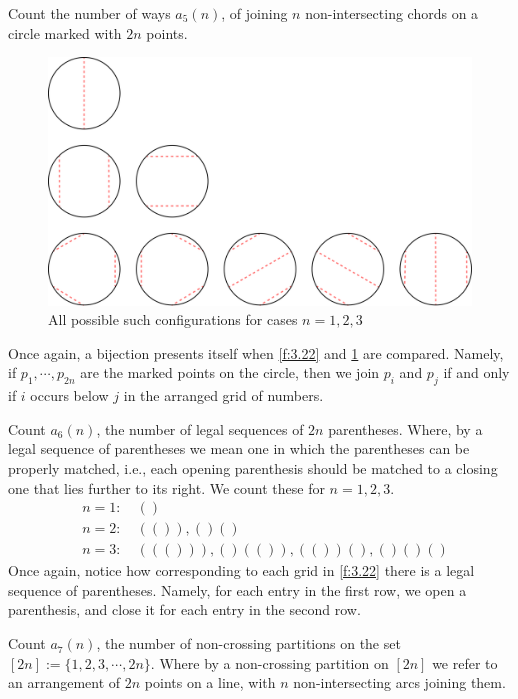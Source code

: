 \begin{question}
Count the number of ways $a_5(n)$, of joining $n$ non-intersecting chords on a circle marked with $2n$ points.     
\end{question}
\begin{solution}
\begin{figure}[H]
    \centering
    \includegraphics[width=0.8\linewidth]{Images/Figure14.png}
    \caption{All possible such configurations for cases $n=1,2,3$}
    \label{f:3.24}
\end{figure}
Once again, a bijection presents itself when \cref{f:3.22} and \cref{f:3.24} are compared. Namely, if $p_1,\cdots,p_{2n}$ are the marked points on the circle, then we join $p_i$ and $p_j$ if and only if $i$ occurs below $j$ in the arranged grid of numbers. 
\end{solution}
\begin{question}
Count $a_6(n)$, the number of legal sequences of $2n$ parentheses. Where, by a legal sequence of parentheses we mean one in which the parentheses can be properly matched, i.e., each opening parenthesis should be matched to a closing one that lies further to its right. We count these for $n=1,2,3$.
\begin{align*}
    & n=1: \quad \left(\right) \\
    & n=2: \quad \left(\left(\right)\right), \left(\right)\left(\right) \\
    & n=3: \quad \left(\left(\left(\right)\right)\right), \left(\right)\left(\left(\right)\right), \left(\left(\right)\right)\left(\right), \left(\right)\left(\right)\left(\right)
\end{align*}
Once again, notice how corresponding to each grid in \cref{f:3.22} there is a legal sequence of parentheses. Namely, for each entry in the first row, we open a parenthesis, and close it for each entry in the second row.    
\end{question}
\begin{question}
Count $a_7(n)$, the number of non-crossing partitions on the set $[2n]:=\{1,2,3,\cdots,2n\}$. Where by a non-crossing partition on $[2n]$ we refer to an arrangement of $2n$ points on a line, with $n$ non-intersecting arcs joining them.    
\end{question}

